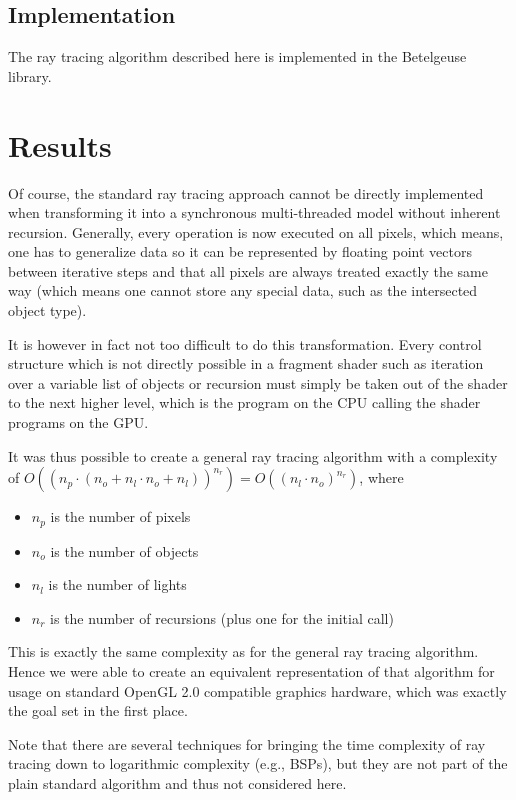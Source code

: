 \documentclass[english,fleqn,10pt,twocolumn]{article}
\begin{document}
\subsection{Implementation}

The ray tracing algorithm described here is implemented in the Betelgeuse library.


\section{Results}

Of course, the standard ray tracing approach cannot be directly implemented when transforming it into a synchronous multi-threaded model without inherent recursion. Generally, every operation is now executed on all pixels, which means,
one has to generalize data so it can be represented by floating point vectors between iterative steps and that all pixels are always treated exactly the same way (which means one cannot store any special data, such as the intersected
object type).

It is however in fact not too difficult to do this transformation. Every control structure which is not directly possible in a fragment shader such as iteration over a variable list of objects or recursion must simply be taken out of the
shader to the next higher level, which is the program on the CPU calling the shader programs on the GPU.

It was thus possible to create a general ray tracing algorithm with a complexity of $O((n_p \cdot (n_o + n_l \cdot n_o + n_l))^{n_r}) = O((n_l \cdot n_o)^{n_r})$, where
\begin{itemize}
    \item $n_p$ is the number of pixels
    \item $n_o$ is the number of objects
    \item $n_l$ is the number of lights
    \item $n_r$ is the number of recursions (plus one for the initial call)
\end{itemize}

This is exactly the same complexity as for the general ray tracing algorithm. Hence we were able to create an equivalent representation of that algorithm for usage on standard OpenGL 2.0 compatible graphics hardware, which was exactly
the goal set in the first place.

Note that there are several techniques for bringing the time complexity of ray tracing down to logarithmic complexity (e.g., BSPs), but they are not part of the plain standard algorithm and thus not considered here.
\end{document}
